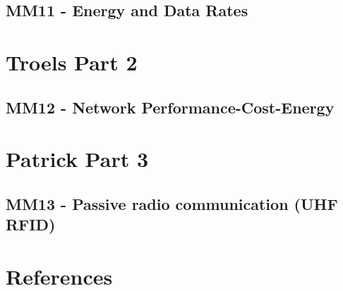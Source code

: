 \chapter{MM11 - Energy and Data Rates}





\part{Troels Part 2}
\chapter{MM12 - Network Performance-Cost-Energy}




\part{Patrick Part 3}
\chapter{MM13 - Passive radio communication (UHF RFID)}




\part{References}



%


